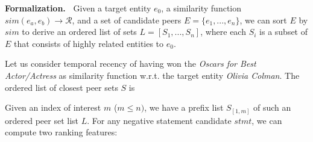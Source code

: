 \noindent
\textbf{Formalization.\ }
Given a target entity $e_0$, a similarity function $\textit{sim}(e_a,e_b) \rightarrow \mathcal{R}$, and a set of candidate peers $E=\{e_1,...,e_n\}$, we can sort $E$ by $\textit{sim}$ to derive an ordered list of sets $L=[S_1, ..., S_n]$, where each $S_i$ is a subset of $E$ that consists of highly related entities to $e_0$.
\begin{example}
Let us consider temporal recency of having won the \textit{Oscars for Best Actor/Actress} as similarity function w.r.t. the target entity %
\emph{Olivia Colman}.   The ordered list of closest peer sets $S$ is 
\end{example}


Given an index of interest $m$ ($m \leq n)$, we have a prefix list $S_{[1,m]}$   of such an ordered peer set list $L$. For any negative statement candidate $\textit{stmt}$, we can     compute two ranking features:

